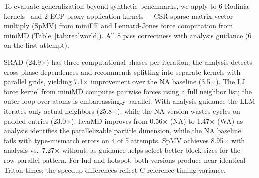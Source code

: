 To evaluate generalization beyond synthetic benchmarks, we apply
\sysname to 6 Rodinia kernels~\cite{che2009rodinia} and 2 ECP proxy
application kernels~\cite{heroux2009mantevo}---CSR sparse matrix-vector
multiply (SpMV) from miniFE and Lennard-Jones force computation from
miniMD (Table~\ref{tab:realworld}).  All 8 pass correctness with
analysis guidance (6 on the first attempt).

SRAD (24.9$\times$) has three computational phases per iteration;
the analysis detects cross-phase dependences and recommends splitting
into separate kernels with parallel grids, yielding 7.1$\times$
improvement over the NA baseline (3.5$\times$).
The LJ force kernel from miniMD computes pairwise forces using a full
neighbor list; the outer loop over atoms is embarrassingly parallel.
With analysis guidance the LLM iterates only actual neighbors
(25.8$\times$), while the NA version wastes cycles on padded entries
(23.0$\times$).
lavaMD improves from 0.56$\times$ (NA) to 1.47$\times$ (WA) as
analysis identifies the parallelizable particle dimension, while the
NA baseline fails with type-mismatch errors on 4 of 5 attempts.
SpMV achieves 8.95$\times$ with analysis vs.\ 7.27$\times$ without,
as guidance helps select better block sizes for the row-parallel pattern.
For lud and hotspot, both versions produce near-identical Triton
times; the speedup differences reflect C reference timing variance.
